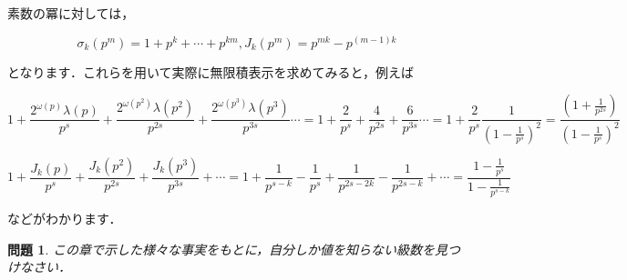 \documentclass[./main]{subfiles}
\theoremstyle{break}
\newtheorem*{prb}{問題}
\begin{document}
素数の冪に対しては，

\[\sigma_k(p^m)=1+p^k+\cdots+p^{km},J_k(p^m)=p^{mk}-p^{(m-1)k}\]

となります．これらを用いて実際に無限積表示を求めてみると，例えば

\[1+\frac{2^{\omega(p)}\lambda(p)}{p^s}+\frac{2^{\omega(p^2)}\lambda(p^2)}{p^{2s}}+\frac{2^{\omega(p^3)}\lambda(p^3)}{p^{3s}}\cdots=1+\frac{2}{p^s}+\frac{4}{p^{2s}}+\frac{6}{p^{3s}}\cdots=1+\frac{2}{p^s}\frac{1}{\left( 1-\frac{1}{p^s} \right)^2}=\frac{\left( 1+\frac{1}{p^{2s}} \right)}{\left( 1-\frac{1}{p^s} \right)^2}\]

\[1+\frac{J_k(p)}{p^s}+\frac{J_k(p^2)}{p^{2s}}+\frac{J_k(p^3)}{p^{3s}}+\cdots=1+\frac{1}{p^{s-k}}-\frac{1}{p^s}+\frac{1}{p^{2s-2k}}-\frac{1}{p^{2s-k}}+\cdots=\frac{1-\frac{1}{p^s}}{1-\frac{1}{p^{s-k}}}\]

などがわかります．

\begin{prb}
この章で示した様々な事実をもとに，自分しか値を知らない級数を見つけなさい．
\end{prb}
\end{document}
